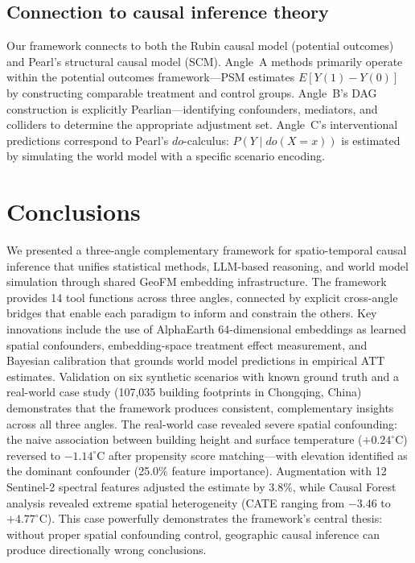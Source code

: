 \documentclass{article}
\begin{document}
\subsection{Connection to causal inference theory}

Our framework connects to both the Rubin causal model (potential outcomes) and Pearl's structural causal model (SCM). Angle~A methods primarily operate within the potential outcomes framework---PSM estimates $E[Y(1) - Y(0)]$ by constructing comparable treatment and control groups. Angle~B's DAG construction is explicitly Pearlian---identifying confounders, mediators, and colliders to determine the appropriate adjustment set. Angle~C's interventional predictions correspond to Pearl's $do$-calculus: $P(Y \mid do(X=x))$ is estimated by simulating the world model with a specific scenario encoding.


\section{Conclusions}
\label{sec:conclusions}

We presented a three-angle complementary framework for spatio-temporal causal inference that unifies statistical methods, LLM-based reasoning, and world model simulation through shared GeoFM embedding infrastructure. The framework provides 14 tool functions across three angles, connected by explicit cross-angle bridges that enable each paradigm to inform and constrain the others. Key innovations include the use of AlphaEarth 64-dimensional embeddings as learned spatial confounders, embedding-space treatment effect measurement, and Bayesian calibration that grounds world model predictions in empirical ATT estimates. Validation on six synthetic scenarios with known ground truth and a real-world case study (107,035 building footprints in Chongqing, China) demonstrates that the framework produces consistent, complementary insights across all three angles. The real-world case revealed severe spatial confounding: the naive association between building height and surface temperature ($+0.24^\circ$C) reversed to $-1.14^\circ$C after propensity score matching---with elevation identified as the dominant confounder (25.0\% feature importance). Augmentation with 12 Sentinel-2 spectral features adjusted the estimate by 3.8\%, while Causal Forest analysis revealed extreme spatial heterogeneity (CATE ranging from $-3.46$ to $+4.77^\circ$C). This case powerfully demonstrates the framework's central thesis: without proper spatial confounding control, geographic causal inference can produce directionally wrong conclusions.
\end{document}
